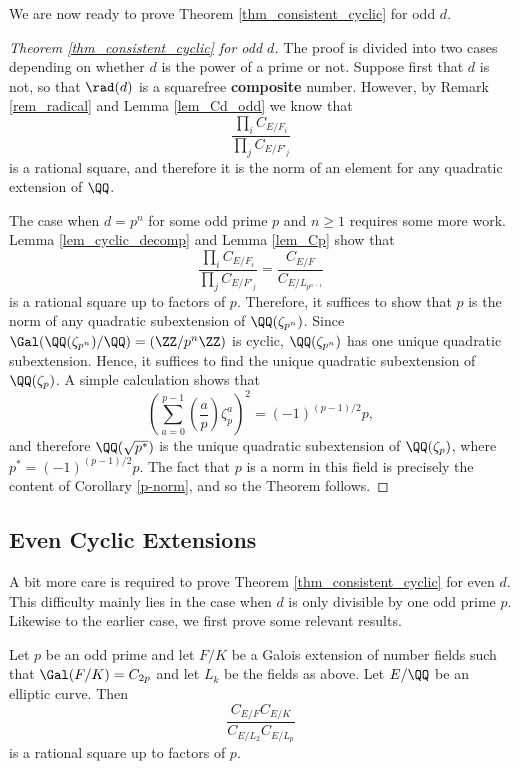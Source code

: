 We are now ready to prove Theorem \ref*{thm_consistent_cyclic} for odd $d$.

\begin{proof}[Theorem \ref*{thm_consistent_cyclic} for odd $d$]
    The proof is divided into two cases depending on whether $d$ is the power of a prime or not. Suppose first that $d$ is not, so that $\rad(d)$ is a squarefree \textbf{composite} number. However, by Remark \ref*{rem_radical} and Lemma \ref*{lem_Cd_odd} we know that 
    $$\frac{\prod_i C_{E/F_i}}{\prod_j C_{E/F'_j}}$$
    is a rational square, and therefore it is the norm of an element for any quadratic extension of $\QQ$. 

    The case when $d=p^n$ for some odd prime $p$ and $n\geq1$ requires some more work. Lemma \ref*{lem_cyclic_decomp} and Lemma \ref*{lem_Cp} show that 
    $$\frac{\prod_i C_{E/F_i}}{\prod_j C_{E/F'_j}}=\frac{C_{E/F}}{C_{E/L_{p^{n-1}}}}$$
    is a rational square up to factors of $p$. Therefore, it suffices to show that $p$ is the norm of any quadratic subextension of $\QQ(\zeta_{p^n})$. Since $\Gal(\QQ(\zeta_{p^n})/\QQ)=(\ZZ/p^n\ZZ)$ is cyclic, $\QQ(\zeta_{p^n})$ has one unique quadratic subextension. Hence, it suffices to find the unique quadratic subextension of $\QQ(\zeta_p)$. A simple calculation shows that 
    $$\left(\sum_{a=0}^{p-1}\left(\frac{a}{p}\right)\zeta_p^a\right)^2=(-1)^{(p-1)/2}p,$$
    and therefore $\QQ(\sqrt{p^*})$ is the unique quadratic subextension of $\QQ(\zeta_p)$, where $p^*=(-1)^{(p-1)/2}p$. The fact that $p$ is a norm in this field is precisely the content of Corollary \ref*{p-norm}, and so the Theorem follows.
\end{proof}
 
\subsection*{Even Cyclic Extensions}
A bit more care is required to prove Theorem \ref*{thm_consistent_cyclic} for even $d$. This difficulty mainly lies in the case when $d$ is only divisible by one odd prime $p$. Likewise to the earlier case, we first prove some relevant results.

\begin{lemma}\label{lem_C2p}
    Let $p$ be an odd prime and let $F/K$ be a Galois extension of number fields such that $\Gal(F/K)=C_{2p}$ and let $L_k$ be the fields as above. Let $E/\QQ$ be an elliptic curve. Then
    $$\frac{C_{E/F}C_{E/K}}{C_{E/L_2}C_{E/L_p}}$$
    is a rational square up to factors of $p$.
\end{lemma}

